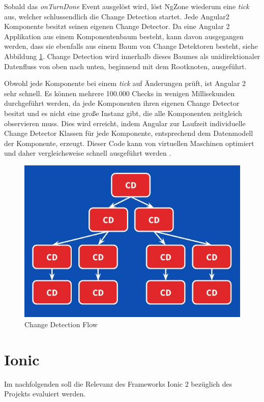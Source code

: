 Sobald das \emph{onTurnDone} Event ausgelöst wird, löst NgZone wiederum eine \emph{tick} aus, welcher schlussendlich die Change Detection startet.
Jede Angular2 Komponente besitzt seinen eigenen Change Detector. Da eine Angular 2 Applikation aus einem Komponentenbaum besteht,
kann davon ausgegangen werden, dass sie ebenfalls aus einem Baum von Change Detektoren besteht, siehe Abbildung \ref{cdflow}.
Change Detection wird innerhalb dieses Baumes als unidirektionaler Datenfluss von oben nach unten, beginnend mit dem Rootknoten, ausgeführt.

Obwohl jede Komponente bei einem \emph{tick} auf Änderungen prüft, ist Angular 2 sehr schnell. Es können mehrere 100.000 Checks in wenigen Millisekunden durchgeführt werden,
da jede Komponenten ihren eigenen Change Detector besitzt und es nicht eine große Instanz gibt, die alle Komponenten zeitgleich observieren muss.
Dies wird erreicht, indem Angular zur Laufzeit individuelle Change Detector Klassen für jede Komponente, entsprechend dem Datenmodell der Komponente, erzeugt.
Dieser Code kann von virtuellen Maschinen optimiert und daher vergleichsweise schnell ausgeführt werden \cite{changedetection-explained}.

\vspace{1cm}

\begin{figure}[ht]
 \centering
 \includegraphics[width=0.7\linewidth]{kapitel3/cd-tree.jpg}
 \caption{Change Detection Flow \cite{changedetection-explained}}
\label{cdflow}
\end{figure}

\newpage
\section{Ionic}

Im nachfolgenden soll die Relevanz des Frameworks Ionic 2 bezüglich des Projekts \projectname{} evaluiert werden.

